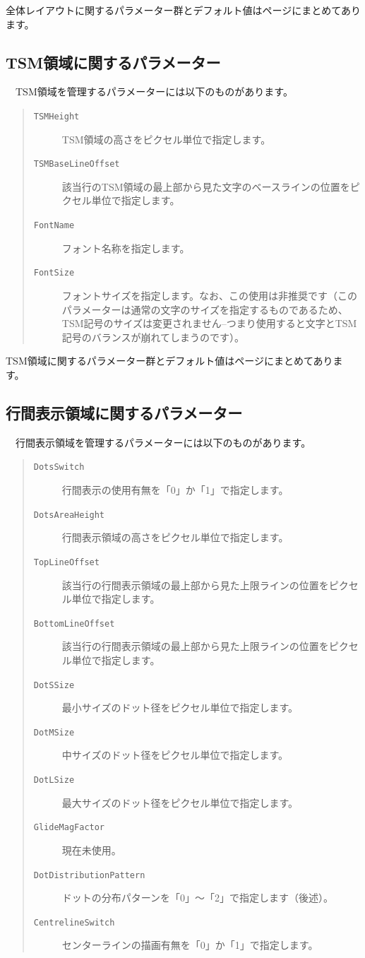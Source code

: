 全体レイアウトに関するパラメーター群とデフォルト値は\pageref{GeneralParameters}ページにまとめてあります。


\subsection{TSM領域に関するパラメーター}

　TSM領域を管理するパラメーターには以下のものがあります。

\begin{quote}
\begin{description}
\item[\texttt{TSMHeight}] TSM領域の高さをピクセル単位で指定します。
\item[\texttt{TSMBaseLineOffset}] 該当行のTSM領域の最上部から見た文字のベースラインの位置をピクセル単位で指定します。
\item[\texttt{FontName}] フォント名称を指定します。
\item[\texttt{FontSize}] フォントサイズを指定します。なお、この使用は非推奨です（このパラメーターは通常の文字のサイズを指定するものであるため、TSM記号のサイズは変更されません--つまり使用すると文字とTSM記号のバランスが崩れてしまうのです）。
\end{description}
\end{quote}

TSM領域に関するパラメーター群とデフォルト値は\pageref{TSMParameters}ページにまとめてあります。

\subsection{行間表示領域に関するパラメーター}

　行間表示領域を管理するパラメーターには以下のものがあります。

\begin{quote}
\begin{description}
\item[\texttt{DotsSwitch}] 行間表示の使用有無を「0」か「1」で指定します。
\item[\texttt{DotsAreaHeight}] 行間表示領域の高さをピクセル単位で指定します。
\item[\texttt{TopLineOffset}] 該当行の行間表示領域の最上部から見た上限ラインの位置をピクセル単位で指定します。
\item[\texttt{BottomLineOffset}] 該当行の行間表示領域の最上部から見た上限ラインの位置をピクセル単位で指定します。
\item[\texttt{DotSSize}] 最小サイズのドット径をピクセル単位で指定します。
\item[\texttt{DotMSize}] 中サイズのドット径をピクセル単位で指定します。
\item[\texttt{DotLSize}] 最大サイズのドット径をピクセル単位で指定します。
\item[\texttt{GlideMagFactor}] 現在未使用。
\item[\texttt{DotDistributionPattern}] ドットの分布パターンを「0」〜「2」で指定します（後述）。
\item[\texttt{CentrelineSwitch}] センターラインの描画有無を「0」か「1」で指定します。
\end{description}
\end{quote}

